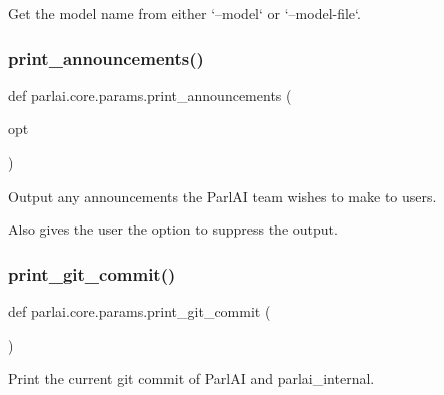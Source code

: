 \begin{DoxyVerb}Get the model name from either `--model` or `--model-file`.
\end{DoxyVerb}
 \mbox{\label{namespaceparlai_1_1core_1_1params_afd1a47c94990168ea9e70d894a79bd2c}} 
\subsubsection{\texorpdfstring{print\+\_\+announcements()}{print\_announcements()}}
{\footnotesize\ttfamily def parlai.\+core.\+params.\+print\+\_\+announcements (\begin{DoxyParamCaption}\item[{}]{opt }\end{DoxyParamCaption})}

\begin{DoxyVerb}Output any announcements the ParlAI team wishes to make to users.

Also gives the user the option to suppress the output.
\end{DoxyVerb}
 \mbox{\label{namespaceparlai_1_1core_1_1params_ac8624bf16ab6b2df0f2869f29a92c90b}} 
\subsubsection{\texorpdfstring{print\+\_\+git\+\_\+commit()}{print\_git\_commit()}}
{\footnotesize\ttfamily def parlai.\+core.\+params.\+print\+\_\+git\+\_\+commit (\begin{DoxyParamCaption}{ }\end{DoxyParamCaption})}

\begin{DoxyVerb}Print the current git commit of ParlAI and parlai_internal.
\end{DoxyVerb}
 \mbox{\label{namespaceparlai_1_1core_1_1params_a714c9ed20ecfb4f9d524ccbe3510fecc}} 
